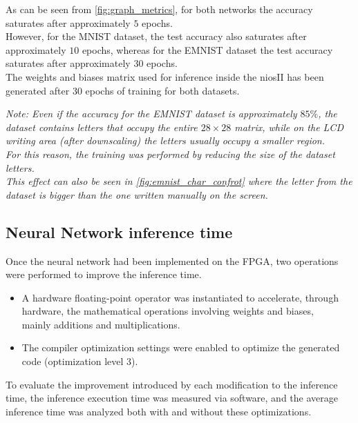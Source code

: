 \noindent
As can be seen from \autoref{fig:graph_metrics}, for both networks the accuracy saturates after approximately \(5\) epochs. \\
However, for the MNIST dataset, the test accuracy also saturates after approximately \(10\) epochs, whereas for the EMNIST dataset the test accuracy saturates after approximately \(30\) epochs. \\
The weights and biases matrix used for inference inside the niosII has been generated after \(30\) epochs of training for both datasets.

\vspace{3em}
\noindent
\textit{Note: Even if the accuracy for the EMNIST dataset is approximately \(85\%\), the dataset contains letters that occupy the entire \(28 \times 28\) matrix, while on the LCD writing area (after downscaling) the letters usually occupy a smaller region. \\
For this reason, the training was performed by reducing the size of the dataset letters. \\
This effect can also be seen in \autoref{fig:emnist_char_confrot} where the letter from the dataset is bigger than the one written manually on the screen.}

\subsection{Neural Network inference time}
\label{sssec:nn_inf_time}

Once the neural network had been implemented on the FPGA, two operations were performed to improve the inference time.

\begin{itemize}
    \setlength\itemsep{0pt}
    \setlength\parskip{0pt}
    \item A hardware floating-point operator was instantiated to accelerate, through hardware, the mathematical operations involving weights and biases, \\
    mainly additions and multiplications.
    \item The compiler optimization settings were enabled to optimize the generated code (optimization level 3).
\end{itemize}

\noindent
To evaluate the improvement introduced by each modification to the inference time, the inference execution time was measured via software, and the average inference time was analyzed both with and without these optimizations.

